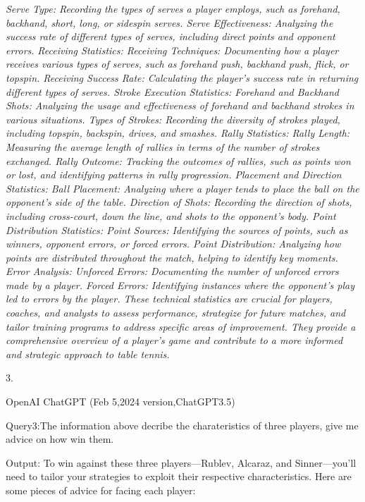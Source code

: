 \emph{
    Serve Type: Recording the types of serves a player employs, such as forehand, backhand, short, long, or sidespin serves.
Serve Effectiveness: Analyzing the success rate of different types of serves, including direct points and opponent errors.
}
\emph{Receiving Statistics:
Receiving Techniques: Documenting how a player receives various types of serves, such as forehand push, backhand push, flick, or topspin.
Receiving Success Rate: Calculating the player's success rate in returning different types of serves.
Stroke Execution Statistics:
Forehand and Backhand Shots: Analyzing the usage and effectiveness of forehand and backhand strokes in various situations.
Types of Strokes: Recording the diversity of strokes played, including topspin, backspin, drives, and smashes.
Rally Statistics:
Rally Length: Measuring the average length of rallies in terms of the number of strokes exchanged.
Rally Outcome: Tracking the outcomes of rallies, such as points won or lost, and identifying patterns in rally progression.
Placement and Direction Statistics:
Ball Placement: Analyzing where a player tends to place the ball on the opponent's side of the table.
Direction of Shots: Recording the direction of shots, including cross-court, down the line, and shots to the opponent's body.
Point Distribution Statistics:
Point Sources: Identifying the sources of points, such as winners, opponent errors, or forced errors.
Point Distribution: Analyzing how points are distributed throughout the match, helping to identify key moments.
Error Analysis:
Unforced Errors: Documenting the number of unforced errors made by a player.
Forced Errors: Identifying instances where the opponent's play led to errors by the player.
These technical statistics are crucial for players, coaches, and analysts to assess performance, 
strategize for future matches, and tailor training programs to address specific areas of improvement. 
They provide a comprehensive overview of a player's game and contribute to a more informed and strategic 
approach to table tennis.}

3.

OpenAI ChatGPT (Feb 5,2024 version,ChatGPT3.5)

Query3:The information above decribe the charateristics of three players, give me advice on how win them. 

Output: To win against these three players—Rublev, Alcaraz, and Sinner—you'll need to tailor your strategies to exploit their respective characteristics. Here are some pieces of advice for facing each player:

